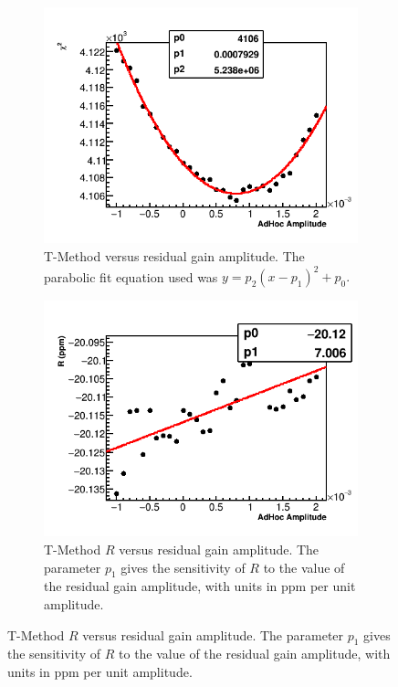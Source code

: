 \begin{figure}[h]
\centering
    \begin{subfigure}[t]{0.45\textwidth}
        \centering
        \includegraphics[width=\textwidth]{TMethod_Chi2_Vs_AdHocAmplitude_Canv}
        \caption{T-Method \chisq versus residual gain amplitude. The parabolic fit equation used was $y = p_{2}(x - p_{1})^{2} + p_{0}.$}
    \end{subfigure}%
    \hspace{1cm}
    \begin{subfigure}[t]{0.45\textwidth}
        \centering
        \includegraphics[width=\textwidth]{TMethod_R_Vs_AdHocAmplitude_Canv}
        \caption{T-Method $R$ versus residual gain amplitude. The parameter $p_{1}$ gives the sensitivity of $R$ to the value of the residual gain amplitude, with units in ppm per unit amplitude.}
    \end{subfigure}


\end{figure}
